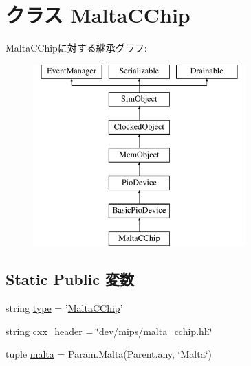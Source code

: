 \hypertarget{classMalta_1_1MaltaCChip}{
\section{クラス MaltaCChip}
\label{classMalta_1_1MaltaCChip}
}
MaltaCChipに対する継承グラフ:\begin{figure}[H]
\begin{center}
\leavevmode
\includegraphics[height=7cm]{classMalta_1_1MaltaCChip}
\end{center}
\end{figure}
\subsection*{Static Public 変数}
\begin{DoxyCompactItemize}
\item 
string \hyperlink{classMalta_1_1MaltaCChip_acce15679d830831b0bbe8ebc2a60b2ca}{type} = '\hyperlink{classMalta_1_1MaltaCChip}{MaltaCChip}'
\item 
string \hyperlink{classMalta_1_1MaltaCChip_a17da7064bc5c518791f0c891eff05fda}{cxx\_\-header} = \char`\"{}dev/mips/malta\_\-cchip.hh\char`\"{}
\item 
tuple \hyperlink{classMalta_1_1MaltaCChip_ae688b1cb082350c971cc4aaf26b66104}{malta} = Param.Malta(Parent.any, \char`\"{}Malta\char`\"{})
\end{DoxyCompactItemize}



